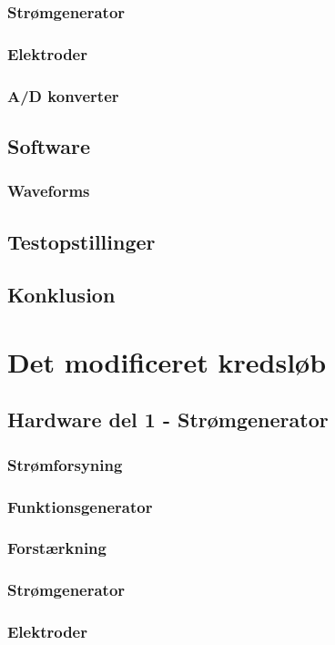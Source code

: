 \subsection{Strømgenerator}
\subsection{Elektroder}
\subsection{A/D konverter}
\section{Software}
\subsection{Waveforms}

\section{Testopstillinger}
\section{Konklusion}

\chapter{Det modificeret kredsløb}
\section{Hardware del 1 - Strømgenerator}
\subsection{Strømforsyning}
\subsection{Funktionsgenerator}
\subsection{Forstærkning}
\subsection{Strømgenerator}
\subsection{Elektroder}
